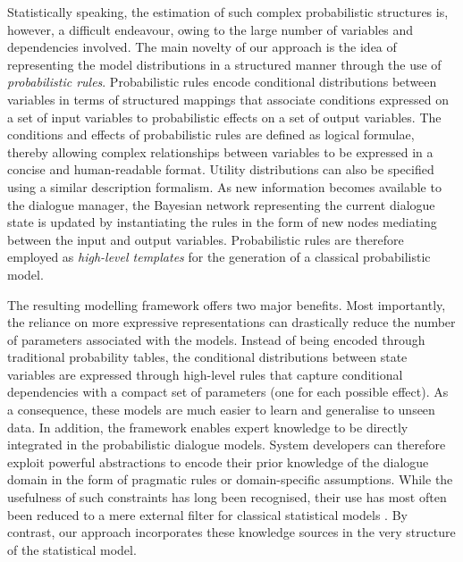 Statistically speaking, the estimation of such complex probabilistic structures is, however, a difficult endeavour, owing to the large number of variables and dependencies involved. The main novelty of our approach is the idea of representing the model distributions in a structured manner through the use of  \textit{probabilistic rules}.  Probabilistic rules encode conditional distributions between variables in terms of structured mappings that associate conditions expressed on a set of input variables to probabilistic effects on a set of output variables. The conditions and effects of probabilistic rules are defined as logical formulae, thereby allowing complex relationships between variables to be expressed in a concise and human-readable format.  Utility distributions can also be specified using a similar description formalism. As new information becomes available to the dialogue manager, the Bayesian network representing the current dialogue state is updated by instantiating the rules in the form of new nodes mediating between the input and output variables. Probabilistic rules are therefore employed as \textit{high-level templates} for the generation of a classical probabilistic model.  

The resulting modelling framework offers two major benefits. Most importantly, the reliance on more expressive representations can drastically reduce the number of parameters associated with the models.  Instead of being encoded through traditional probability tables, the conditional distributions between state variables are expressed through high-level rules that capture conditional dependencies with a compact set of parameters (one for each possible effect). As a consequence, these models are much easier to learn and generalise to unseen data.  In addition, the framework enables expert knowledge to be directly integrated in the probabilistic dialogue models. System developers can therefore exploit powerful abstractions to encode their prior knowledge of the dialogue domain in the form of pragmatic rules or domain-specific assumptions.   While the usefulness of such constraints has long been recognised, their use has most often been reduced to a mere external filter for classical statistical models \citep{heeman2007,williams2008}. By contrast, our approach incorporates these knowledge sources in the very structure of the statistical model. 

